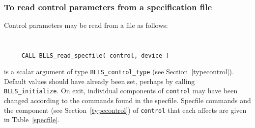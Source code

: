 \documentclass{galahad}
\newcommand{\packagename}{BLLS}
\begin{document}
\subsubsection{To read control parameters from a specification file}
\label{readspec}

Control parameters may be read from a file as follows:
\hskip0.5in

\def\baselinestretch{0.8}
{\tt
\begin{verbatim}
     CALL BLLS_read_specfile( control, device )
\end{verbatim}
}
\def\baselinestretch{1.0}

\begin{description}
 is a scalar \intentinout argument of type
{\tt \packagename\_control\_type}
(see Section~\ref{typecontrol}).
Default values should have already been set, perhaps by calling
{\tt \packagename\_initialize}.
On exit, individual components of {\tt control} may have been changed
according to the commands found in the specfile. Specfile commands and
the component (see Section~\ref{typecontrol}) of {\tt control}
that each affects are given in Table~\ref{specfile}.


\end{description}
\end{document}
